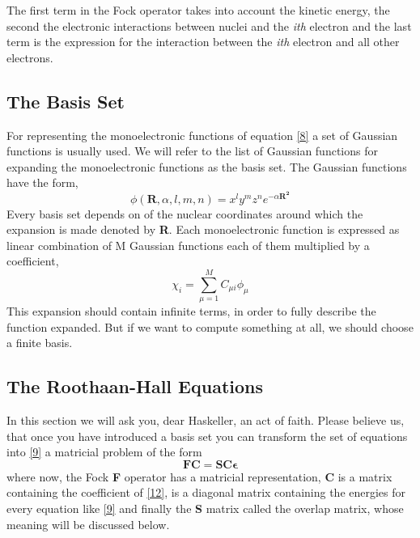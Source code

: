 \documentclass{tmr}
\begin{document}
The first term in the Fock operator takes into account the kinetic energy, the second
the electronic interactions between nuclei and the \textit{ith} electron and the last term
is the expression for the interaction between the \textit{ith} electron 
and all other electrons.

\subsection{The Basis Set}
For representing the monoelectronic functions of equation \eqref{8} a set of Gaussian 
functions is usually used. We will refer to the list of Gaussian functions for 
expanding the monoelectronic functions as the basis set. The Gaussian
functions have the form,
\begin{equation}\label{11}
\phi(\mathbf{R},\alpha,l,m,n) = x^{l}y^{m}z^{n} e^{-\alpha\mathbf{R^{2}}}
\end{equation}
Every basis set depends on of the nuclear coordinates around
which the expansion is made denoted by \textbf{R}. Each monoelectronic 
function is expressed as linear combination of M Gaussian 
functions each of them multiplied by a coefficient,
\begin{equation}\label{12}
\chi_{i} = \sum_{\mu = 1}^{M} C_{\mu i} \phi_{\mu}
\end{equation}
This expansion should contain infinite terms, in order to 
fully describe the function expanded. But if we
want to compute something at all, we should choose a finite basis.

\subsection{The Roothaan-Hall Equations}
In this section we will ask you, dear Haskeller, an act of faith. Please believe us,
that once you have introduced a basis set you can transform the set of equations into
\eqref{9} a matricial problem of the form 
\begin{equation}\label{13}
\mathbf{FC} = \mathbf{SC\epsilon}
\end{equation}
where now, the Fock \textbf{F} operator has a matricial representation, 
\textbf{C} is a matrix containing the coefficient of \eqref{12}, \textbf{\textepsilon}
is a diagonal matrix containing the energies for every equation like \eqref{9} and finally
the \textbf{S} matrix called the overlap matrix, whose meaning will be discussed below.
\end{document}
